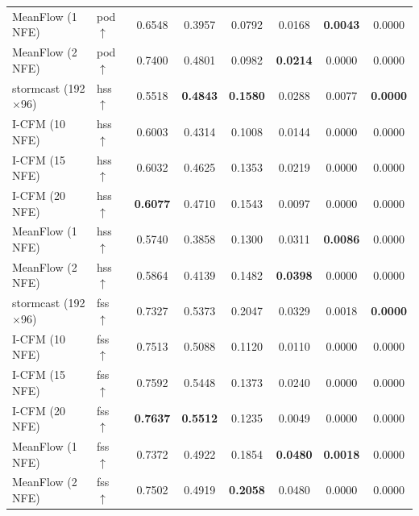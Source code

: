 \documentclass[border=10pt]{standalone}
\begin{document}
\begin{tabular}{llcccccc}
MeanFlow (1 NFE) & pod $\uparrow$ & 0.6548 & 0.3957 & 0.0792 & 0.0168 & \textbf{0.0043} & 0.0000 \\
MeanFlow (2 NFE) & pod $\uparrow$ & 0.7400 & 0.4801 & 0.0982 & \textbf{0.0214} & 0.0000 & 0.0000 \\
\midrule
stormcast (192$\times$96) & hss $\uparrow$ & 0.5518 & \textbf{0.4843} & \textbf{0.1580} & 0.0288 & 0.0077 & \textbf{0.0000} \\
I-CFM (10 NFE) & hss $\uparrow$ & 0.6003 & 0.4314 & 0.1008 & 0.0144 & 0.0000 & 0.0000 \\
I-CFM (15 NFE) & hss $\uparrow$ & 0.6032 & 0.4625 & 0.1353 & 0.0219 & 0.0000 & 0.0000 \\
I-CFM (20 NFE) & hss $\uparrow$ & \textbf{0.6077} & 0.4710 & 0.1543 & 0.0097 & 0.0000 & 0.0000 \\
MeanFlow (1 NFE) & hss $\uparrow$ & 0.5740 & 0.3858 & 0.1300 & 0.0311 & \textbf{0.0086} & 0.0000 \\
MeanFlow (2 NFE) & hss $\uparrow$ & 0.5864 & 0.4139 & 0.1482 & \textbf{0.0398} & 0.0000 & 0.0000 \\
\midrule
stormcast (192$\times$96) & fss $\uparrow$ & 0.7327 & 0.5373 & 0.2047 & 0.0329 & 0.0018 & \textbf{0.0000} \\
I-CFM (10 NFE) & fss $\uparrow$ & 0.7513 & 0.5088 & 0.1120 & 0.0110 & 0.0000 & 0.0000 \\
I-CFM (15 NFE) & fss $\uparrow$ & 0.7592 & 0.5448 & 0.1373 & 0.0240 & 0.0000 & 0.0000 \\
I-CFM (20 NFE) & fss $\uparrow$ & \textbf{0.7637} & \textbf{0.5512} & 0.1235 & 0.0049 & 0.0000 & 0.0000 \\
MeanFlow (1 NFE) & fss $\uparrow$ & 0.7372 & 0.4922 & 0.1854 & \textbf{0.0480} & \textbf{0.0018} & 0.0000 \\
MeanFlow (2 NFE) & fss $\uparrow$ & 0.7502 & 0.4919 & \textbf{0.2058} & 0.0480 & 0.0000 & 0.0000 \\
\bottomrule
\end{tabular}
\end{document}
